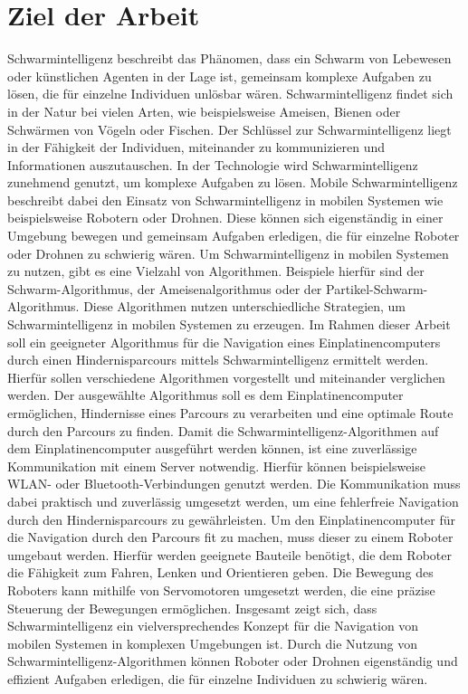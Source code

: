 \section{Ziel der Arbeit}
Schwarmintelligenz beschreibt das Phänomen, dass ein Schwarm von Lebewesen oder künstlichen Agenten in der Lage ist, gemeinsam komplexe Aufgaben zu lösen, die für einzelne Individuen unlösbar wären. Schwarmintelligenz findet sich in der Natur bei vielen Arten, wie beispielsweise Ameisen, Bienen oder Schwärmen von Vögeln oder Fischen. Der Schlüssel zur Schwarmintelligenz liegt in der Fähigkeit der Individuen, miteinander zu kommunizieren und Informationen auszutauschen.
In der Technologie wird Schwarmintelligenz zunehmend genutzt, um komplexe Aufgaben zu lösen. Mobile Schwarmintelligenz beschreibt dabei den Einsatz von Schwarmintelligenz in mobilen Systemen wie beispielsweise Robotern oder Drohnen. Diese können sich eigenständig in einer Umgebung bewegen und gemeinsam Aufgaben erledigen, die für einzelne Roboter oder Drohnen zu schwierig wären.
Um Schwarmintelligenz in mobilen Systemen zu nutzen, gibt es eine Vielzahl von Algorithmen. Beispiele hierfür sind der Schwarm-Algorithmus, der Ameisenalgorithmus oder der Partikel-Schwarm-Algorithmus. Diese Algorithmen nutzen unterschiedliche Strategien, um Schwarmintelligenz in mobilen Systemen zu erzeugen.
Im Rahmen dieser Arbeit soll ein geeigneter Algorithmus für die Navigation eines Einplatinencomputers durch einen Hindernisparcours mittels Schwarmintelligenz ermittelt werden. Hierfür sollen verschiedene Algorithmen vorgestellt und miteinander verglichen werden. Der ausgewählte Algorithmus soll es dem Einplatinencomputer ermöglichen, Hindernisse eines Parcours zu verarbeiten und eine optimale Route durch den Parcours zu finden.
Damit die Schwarmintelligenz-Algorithmen auf dem Einplatinencomputer ausgeführt werden können, ist eine zuverlässige Kommunikation mit einem Server notwendig. Hierfür können beispielsweise WLAN- oder Bluetooth-Verbindungen genutzt werden. Die Kommunikation muss dabei praktisch und zuverlässig umgesetzt werden, um eine fehlerfreie Navigation durch den Hindernisparcours zu gewährleisten.
Um den Einplatinencomputer für die Navigation durch den Parcours fit zu machen, muss dieser zu einem Roboter umgebaut werden. Hierfür werden geeignete Bauteile benötigt, die dem Roboter die Fähigkeit zum Fahren, Lenken und Orientieren geben. Die Bewegung des Roboters kann mithilfe von Servomotoren umgesetzt werden, die eine präzise Steuerung der Bewegungen ermöglichen.
Insgesamt zeigt sich, dass Schwarmintelligenz ein vielversprechendes Konzept für die Navigation von mobilen Systemen in komplexen Umgebungen ist. Durch die Nutzung von Schwarmintelligenz-Algorithmen können Roboter oder Drohnen eigenständig und effizient Aufgaben erledigen, die für einzelne Individuen zu schwierig wären.